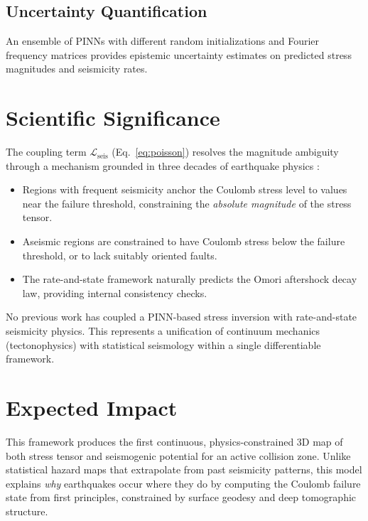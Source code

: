 \documentclass[11pt, a4paper]{article}
\begin{document}
\subsection{Uncertainty Quantification}
An ensemble of PINNs with different random initializations and Fourier frequency matrices provides epistemic uncertainty estimates on predicted stress magnitudes and seismicity rates.

\section{Scientific Significance}

The coupling term $\mathcal{L}_{\text{seis}}$ (Eq.~\ref{eq:poisson}) resolves the magnitude ambiguity through a mechanism grounded in three decades of earthquake physics \cite{Dieterich1994}:
\begin{itemize}
    \item Regions with frequent seismicity anchor the Coulomb stress level to values near the failure threshold, constraining the \textit{absolute magnitude} of the stress tensor.
    \item Aseismic regions are constrained to have Coulomb stress below the failure threshold, or to lack suitably oriented faults.
    \item The rate-and-state framework naturally predicts the Omori aftershock decay law, providing internal consistency checks.
\end{itemize}

No previous work has coupled a PINN-based stress inversion with rate-and-state seismicity physics. This represents a unification of continuum mechanics (tectonophysics) with statistical seismology within a single differentiable framework.

\section{Expected Impact}

This framework produces the first continuous, physics-constrained 3D map of both stress tensor and seismogenic potential for an active collision zone. Unlike statistical hazard maps that extrapolate from past seismicity patterns, this model explains \textit{why} earthquakes occur where they do by computing the Coulomb failure state from first principles, constrained by surface geodesy and deep tomographic structure.
\end{document}
